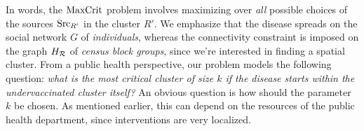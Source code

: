 In words, the $\text{MaxCrit}{}$ problem involves maximizing over \emph{all} possible
choices of the sources $\text{Src}_{R'}$ in the cluster $R'$. We emphasize that the disease spreads on the social network $G$ of \emph{individuals}, whereas the connectivity constraint is imposed on the graph $H_{\mathcal{R}}$ of \emph{census block groups}, since we're interested in finding a spatial cluster. From a public health perspective, our problem models the following question: \emph{what is the most critical cluster of size $k$ if the disease starts within the undervaccinated cluster itself?} An obvious question is how should the parameter $k$ be chosen. As mentioned earlier, this can depend on the resources of the public health department, since interventions are very localized.






